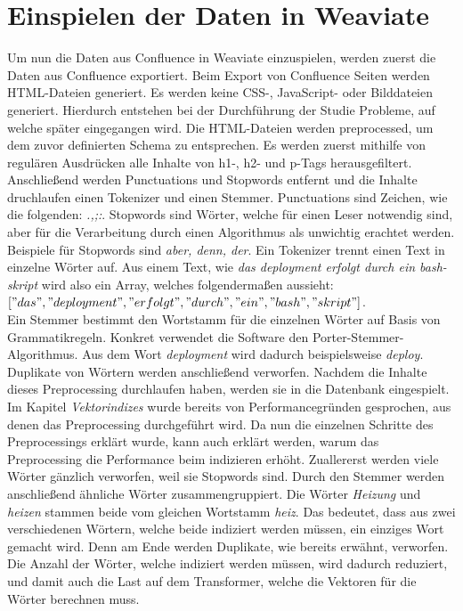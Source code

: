 \section{Einspielen der Daten in Weaviate}
Um nun die Daten aus Confluence in Weaviate einzuspielen, werden zuerst die Daten aus Confluence exportiert.
Beim Export von Confluence Seiten werden HTML-Dateien generiert.
Es werden keine CSS-, JavaScript- oder Bilddateien generiert.
Hierdurch entstehen bei der Durchführung der Studie Probleme, auf welche später eingegangen wird.
Die HTML-Dateien werden preprocessed, um dem zuvor definierten Schema zu entsprechen.
Es werden zuerst mithilfe von regulären Ausdrücken alle Inhalte von h1-, h2- und p-Tags herausgefiltert.
Anschließend werden Punctuations und Stopwords entfernt und die Inhalte druchlaufen einen Tokenizer und einen Stemmer.
Punctuations sind Zeichen, wie die folgenden: \textit{.,;:}.
Stopwords sind Wörter, welche für einen Leser notwendig sind, aber für die Verarbeitung durch einen Algorithmus als unwichtig erachtet werden\cite{Sarica_Luo_2021}.
Beispiele für Stopwords sind \textit{aber, denn, der}.
Ein Tokenizer trennt einen Text in einzelne Wörter auf.
Aus einem Text, wie \textit{das deployment erfolgt durch ein bash-skript} wird also ein Array, welches folgendermaßen aussieht:\\

\(["das", "deployment", "erfolgt", "durch", "ein", "bash", "skript"]\).\\

Ein Stemmer bestimmt den Wortstamm für die einzelnen Wörter auf Basis von Grammatikregeln.
Konkret verwendet die Software den Porter-Stemmer-Algorithmus.
Aus dem Wort \textit{deployment} wird dadurch beispielsweise \textit{deploy}.
Duplikate von Wörtern werden anschließend verworfen.
Nachdem die Inhalte dieses Preprocessing durchlaufen haben, werden sie in die Datenbank eingespielt.\\

Im Kapitel \textit{Vektorindizes} wurde bereits von Performancegründen gesprochen, aus denen das Preprocessing durchgeführt wird.
Da nun die einzelnen Schritte des Preprocessings erklärt wurde, kann auch erklärt werden, warum das Preprocessing die Performance beim indizieren erhöht.
Zuallererst werden viele Wörter gänzlich verworfen, weil sie Stopwords sind.
Durch den Stemmer werden anschließend ähnliche Wörter zusammengruppiert.
Die Wörter \textit{Heizung} und \textit{heizen} stammen beide vom gleichen Wortstamm \textit{heiz}.
Das bedeutet, dass aus zwei verschiedenen Wörtern, welche beide indiziert werden müssen, ein einziges Wort gemacht wird.
Denn am Ende werden Duplikate, wie bereits erwähnt, verworfen.
Die Anzahl der Wörter, welche indiziert werden müssen, wird dadurch reduziert, und damit auch die Last auf dem Transformer, welche die Vektoren für die Wörter berechnen muss.

